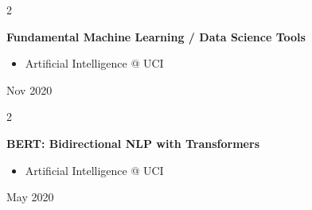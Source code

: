 \documentclass[10pt, letterpaper]{article}
\newenvironment{highlights}{
    \begin{itemize}[
        topsep=0.10 cm,
        parsep=0.10 cm,
        partopsep=0pt,
        itemsep=0pt,
        leftmargin=0.4 cm + 10pt
    ]
}{
    \end{itemize}
} %
\newenvironment{twocolentry}[2][]{
    \onecolentry
    \def\secondColumn{#2}
    \setcolumnwidth{\fill, 4.5 cm}
    \begin{paracol}{2}
}{
    \switchcolumn \raggedleft \secondColumn
    \end{paracol}
    \endonecolentry
} %
\begin{document}
        \vspace{0.2 cm}

        \begin{twocolentry}{
            Nov 2020
        }
            \textbf{Fundamental Machine Learning / Data Science Tools}
            \begin{highlights}
                \item Artificial Intelligence @ UCI
            \end{highlights}
        \end{twocolentry}


        \vspace{0.2 cm}

        \begin{twocolentry}{
            May 2020
        }
            \textbf{BERT: Bidirectional NLP with Transformers}
            \begin{highlights}
                \item Artificial Intelligence @ UCI
            \end{highlights}
        \end{twocolentry}



    
\end{document}
